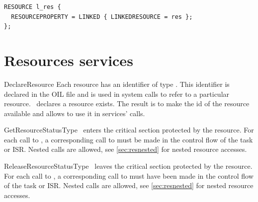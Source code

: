 \begin{lstlisting}[language=OIL]
RESOURCE l_res {
  RESOURCEPROPERTY = LINKED { LINKEDRESOURCE = res };
};
\end{lstlisting}


\section{Resources services}

\begin{service}{DeclareResource}{}
Each resource has an identifier of type . This identifier is declared in the OIL file and is used in system calls to refer to a particular resource. \servicename\ declares a resource exists. The result is to make the id of the resource available and allows to use it in services' calls.

\end{service}

\begin{service}{GetResource}{StatusType}
\servicename\ enters the critical section protected by the resource. For each call to \servicename, a corresponding call to  must be made in the control flow of the task or ISR. Nested calls are allowed, see \ref{sec:resnested} for nested resource accesses.
\end{service}

\begin{service}{ReleaseResource}{StatusType}
\servicename\ leaves the critical section protected by the resource. For each call to \servicename, a corresponding call to  must have been made in the control flow of the task or ISR. Nested calls are allowed, see \ref{sec:resnested} for nested resource accesses.



\end{service}
